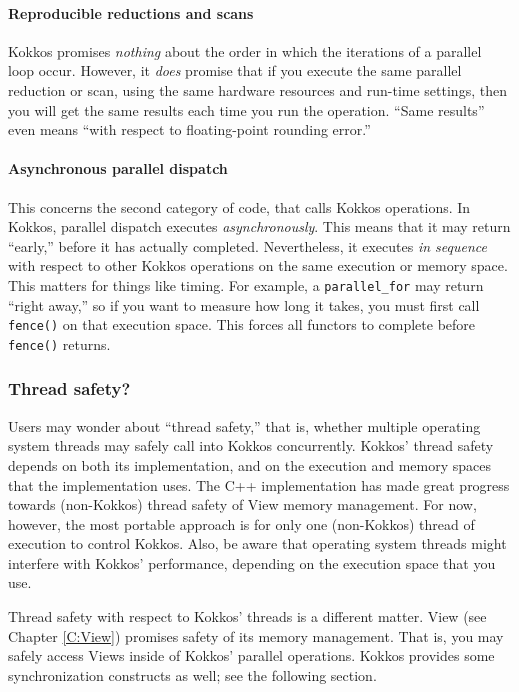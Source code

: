 \paragraph{Reproducible reductions and scans}\label{SS:Model:Exec:Repro}

Kokkos promises \emph{nothing} about the order in which the iterations of a parallel loop occur.
However, it \emph{does} promise that if you execute the same parallel reduction or scan,
using the same hardware resources and run-time settings,
then you will get the same results each time you run the operation.
``Same results'' even means ``with respect to floating-point rounding error.''

\paragraph{Asynchronous parallel dispatch}\label{SS:Model:Exec:Async}

This concerns the second category of code, that calls Kokkos operations.
In Kokkos, parallel dispatch executes \emph{asynchronously}.  
This means that it may return ``early,'' before it has actually completed.
Nevertheless, it executes \emph{in sequence} with respect to other Kokkos operations on the same execution or memory space.
This matters for things like timing.
For example, a \lstinline!parallel_for! may return ``right away,''
so if you want to measure how long it takes,
you must first call \lstinline!fence()! on that execution space.
This forces all functors to complete before \lstinline!fence()! returns.

\subsubsection{Thread safety?}\label{SS:Model:Exec:ThreadSafety}

Users may wonder about ``thread safety,'' that is,
whether multiple operating system threads may safely call into Kokkos concurrently.
Kokkos' thread safety depends on both its implementation, 
and on the execution and memory spaces that the implementation uses.
The C++ implementation has made great progress towards (non-Kokkos) thread safety of View memory management.
For now, however, the most portable approach is for only one (non-Kokkos) thread of execution to control Kokkos.
Also, be aware that operating system threads might interfere with Kokkos' performance,
depending on the execution space that you use.

Thread safety with respect to Kokkos' threads is a different matter.
View (see Chapter \ref{C:View}) promises safety of its memory management.
That is, you may safely access Views inside of Kokkos' parallel operations.
Kokkos provides some synchronization constructs as well; see the following section.
